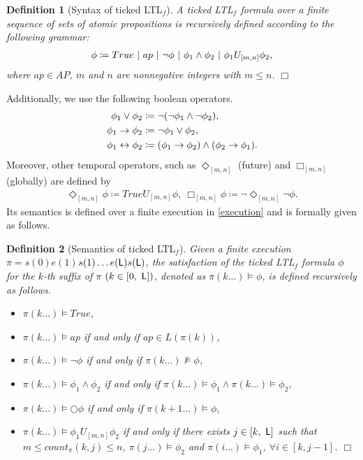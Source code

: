 \documentclass{article}
\newcommand{\qedwhite}{\hfill \ensuremath{\Box}}
\newtheorem{dfn}{Definition}
\newcommand{\req}[1]{\eqref{#1}}
\newcommand{\Len}{{\sf L}}
\begin{document}
\begin{dfn}[Syntax of ticked LTL$_f$]\label{dfn:syntax}
A ticked LTL$_f$ formula over a finite sequence of sets of atomic propositions is recursively defined according to the following grammar: 
\begin{align}
\phi \coloneqq True \ |\ ap\ |\ \lnot \phi\ |\ \phi_1\land \phi_2\ |\ \phi_1U_{[m,n]} \phi_2 ,\notag
\end{align}
where $ap \in AP$, $m$ and $n$ are nonnegative integers with $m\leq n$. \qedwhite
\end{dfn}
%
Additionally, we use the following boolean operators.
\begin{align}
\phi_1 \lor \phi_2 &\coloneqq \lnot(\lnot \phi_1 \land \lnot \phi_2), \notag\\ 
\phi_1 \rightarrow \phi_2 & \coloneqq \lnot \phi_1 \lor \phi_2, \notag\\ 
\phi_1 \leftrightarrow \phi_2 &\coloneqq (\phi_1 \rightarrow \phi_2)\land(\phi_2 \rightarrow \phi_1). \notag
\end{align} 
Moreover, other temporal operators, such as $\Diamond_{[m,n]}$ (future) and $\Box_{[m,n]}$ (globally) are defined by
\begin{align}\label{futureglobal}
\Diamond_{[m,n]} \phi \coloneqq True U_{[m,n]} \phi, \ \Box_{[m,n]} \phi \coloneqq \lnot \Diamond_{[m,n]} \lnot \phi. 
\end{align}
%
Its semantics is defined over a finite execution in \req{execution} and is formally given as follows. 
\begin{dfn}[Semantics of ticked LTL$_f$]
Given a finite execution $\pi = s(0) e(1)$$s(1) \ldots e(\Len) s(\Len)$, the satisfaction of the ticked LTL$_f$ formula $\phi$ for the $k$-th suffix of $\pi$ $(k\in [0,\ \Len])$, denoted as $\pi (k...) \models \phi$, is defined recursively as follows.
\begin{itemize}
\item 	$\pi(k...) \models True$,
\item 	$\pi(k...) \models ap$ if and only if $ap \in L(\pi(k))$,
\item 	$\pi(k...) \models \lnot \phi$ if and only if $\pi(k...) \not\models \phi$,
\item 	$\pi(k...) \models \phi_1\land \phi_2$ if and only if $\pi(k...) \models \phi_1 \land \pi(k...)\models \phi_2$,
\item 	$\pi(k...) \models \bigcirc\phi$ if and only if $\pi(k+1...) \models \phi$,
\item 	$\pi(k...) \models \phi_1U_{[m,n]} \phi_2$ if and only if there exists $j \in [k ,\ \Len]$ such that $m \leq count_\pi(k, j) \leq n$, $\pi(j...) \models \phi_2$ and $\pi(i...) \models \phi_1$, $\forall i \in [k,j-1]$. \qedwhite
	\end{itemize}
	\end{dfn}
\end{document}
